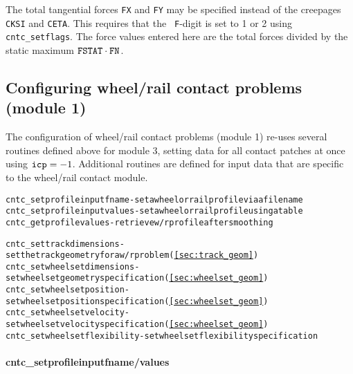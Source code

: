 \documentclass[12pt]{report}
\begin{document}
The total tangential forces {\tt FX} and {\tt FY} may be specified instead
of the creepages {\tt CKSI} and {\tt CETA}. This requires that the {\tt
F}-digit is set to 1 or 2 using {\tt cntc\_set\-flags}. The force values
entered here are the total forces divided by the static maximum
${\tt FSTAT}\cdot{\tt FN}$.

\subsection{Configuring wheel/rail contact problems (module 1)}

The configuration of wheel/rail contact problems (module 1) re-uses several
routines defined above for module 3, setting data for all contact patches
at once using ${\tt icp}=-1$. Additional routines are defined for input
data that are specific to the wheel/rail contact module.
\begin{alltt}\small
cntc_setprofileinputfname   - set a wheel or rail profile via a filename
cntc_setprofileinputvalues  - set a wheel or rail profile using a table
cntc_getprofilevalues       - retrieve w/r profile after smoothing

cntc_settrackdimensions     - set the track geometry for a w/r problem (\ref{sec:track_geom})
cntc_setwheelsetdimensions  - set wheelset geometry specification (\ref{sec:wheelset_geom})
cntc_setwheelsetposition    - set wheelset position specification (\ref{sec:wheelset_geom})
cntc_setwheelsetvelocity    - set wheelset velocity specification (\ref{sec:wheelset_geom})
cntc_setwheelsetflexibility - set wheelset flexibility specification
\end{alltt}

\paragraph{cntc\_setprofileinputfname/values}
\end{document}
